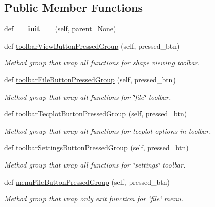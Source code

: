 \subsection*{Public Member Functions}
\begin{DoxyCompactItemize}
\item 
\hypertarget{a00081_a10b91a0caafffe00be0f4fa9c7a022dc}{}\label{a00081_a10b91a0caafffe00be0f4fa9c7a022dc} 
def {\bfseries \+\_\+\+\_\+init\+\_\+\+\_\+} (self, parent=None)
\item 
def \hyperlink{a00081_ade955a1fc8334b12726d9f462ed25c62}{toolbar\+View\+Button\+Pressed\+Group} (self, pressed\+\_\+btn)
\begin{DoxyCompactList}\small\item\em Method group that wrap all functions for shape viewing toolbar. \end{DoxyCompactList}\item 
def \hyperlink{a00081_ab5cf733dc40f2b17761056148fd51263}{toolbar\+File\+Button\+Pressed\+Group} (self, pressed\+\_\+btn)
\begin{DoxyCompactList}\small\item\em Method group that wrap all functions for \char`\"{}file\char`\"{} toolbar. \end{DoxyCompactList}\item 
def \hyperlink{a00081_aabfc46144de45158b8d9c8952cfa1a7d}{toolbar\+Tecplot\+Button\+Pressed\+Group} (self, pressed\+\_\+btn)
\begin{DoxyCompactList}\small\item\em Method group that wrap all functions for tecplot options in toolbar. \end{DoxyCompactList}\item 
def \hyperlink{a00081_abe6ec5c591c19b280f2e24bb198a1d6b}{toolbar\+Settings\+Button\+Pressed\+Group} (self, pressed\+\_\+btn)
\begin{DoxyCompactList}\small\item\em Method group that wrap all functions for \char`\"{}settings\char`\"{} toolbar. \end{DoxyCompactList}\item 
def \hyperlink{a00081_aedcbcf23c32b9661d48f28e11c0c7172}{menu\+File\+Button\+Pressed\+Group} (self, pressed\+\_\+btn)
\begin{DoxyCompactList}\small\item\em Method group that wrap only exit function for \char`\"{}file\char`\"{} menu. \end{DoxyCompactList}\item 

\end{DoxyCompactItemize}

